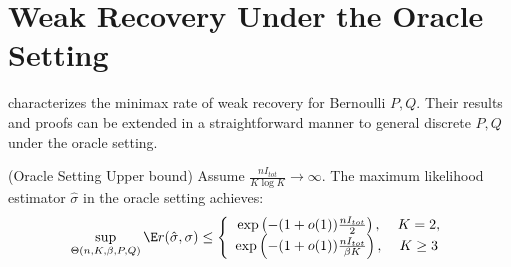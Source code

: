 \documentclass{article}
\begin{document}
\section{Weak Recovery Under the Oracle Setting}

\cite{zhangminimax} characterizes the minimax rate of weak recovery for Bernoulli $P,Q$. Their results and proofs can be extended in a straightforward manner to general discrete $P,Q$ under the oracle setting. 

\begin{proposition} 
\label{prop:weak_recovery_oracle}
(Oracle Setting Upper bound)
Assume $\frac{n I_{tot}}{K \log K} \rightarrow \infty$. The maximum likelihood estimator $\hat{\sigma}$ in the oracle setting achieves:
\[
\sup_{\Theta(n, K, \beta, P, Q)} \E r(\hat{\sigma}, \sigma) \leq \left\{ 
    \begin{array}{cc} 
   \exp \left( - (1 + o(1)) \frac{nI_{tot}}{2} \right ), \, & K=2, \\
   \exp \left( - (1 + o(1)) \frac{nI_{tot}}{\beta K} \right ), \,& K\geq 3
  \end{array} \right. 
\]

\end{proposition}
\end{document}
